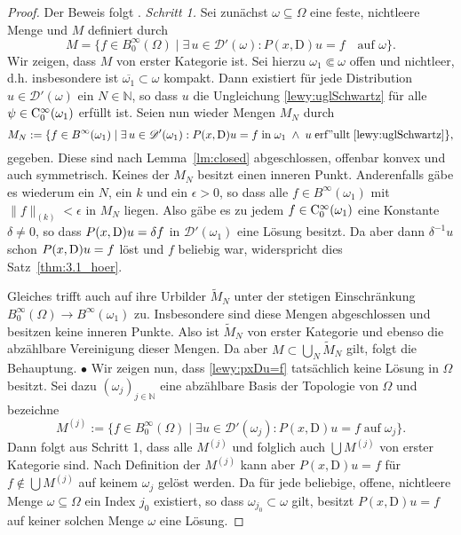 \begin{proof} Der Beweis folgt {\cite[Theorem 3.2]{Hormander:1960a}}.
{\sl Schritt 1.}
Sei zunächst $\omega\subseteq\Omega$ eine feste, nichtleere Menge und $M$ definiert durch
\begin{equation}
M=\{f\in B_0^\infty(\Omega)\mid \exists\,u\in\mathscr{D}'(\omega) : P(x,\mathrm{D})u=f\quad \text{auf $\omega$}\}.
\end{equation}
Wir zeigen, dass $M$ von erster Kategorie ist.  Sei hierzu $\omega_1\Subset\omega$ offen und nichtleer, d.h. insbesondere ist $\overline{\omega_1}\subset\omega$ kompakt. Dann existiert für jede Distribution $u\in\mathscr{D}'(\omega)$ ein $N\in\mathbb{N}$, so dass $u$ die Ungleichung \eqref{lewy:uglSchwartz}
für alle $\psi\in \mathrm C_0^\infty(\omega_1)$ erfüllt ist. Seien nun wieder Mengen $M_N$ durch
\begin{equation}
M_N:= \{f\in B^\infty(\omega_1)\mid \exists\,u\in\mathscr D'(\omega_1): P(x,\mathrm{D})u=f\;\mathrm{in}\;\omega_1\;\wedge\; u\mathrm{\;erf"ullt\;}\eqref{lewy:uglSchwartz}\},
\end{equation}
gegeben. Diese sind nach Lemma~\ref{lm:closed} abgeschlossen, offenbar konvex und auch symmetrisch. 
Keines der $M_N$ besitzt einen inneren Punkt. 
Anderenfalls gäbe es wiederum ein $N$, ein $k$ und ein $\epsilon>0$, so dass alle $f\in B^\infty(\omega_1)$ mit
$\|f\|_{(k)}<\epsilon$ in $M_N$ liegen. Also gäbe es zu jedem $f\in\mathrm C_0^\infty(\omega_1)$ eine Konstante $\delta\ne0$, so dass $P(x,\mathrm D)u=\delta f$ in $\mathscr D'(\omega_1)$ eine L\"osung besitzt. Da aber dann $\delta^{-1}u$ schon $P(x,\mathrm D)u=f$ löst und $f$ beliebig war, widerspricht dies Satz~\ref{thm:3.1_hoer}. 

Gleiches trifft auch auf ihre Urbilder $\widetilde M_N$ unter der stetigen Einschränkung $B^\infty_0(\Omega)\to B^\infty(\omega_1)$ zu. Insbesondere sind diese Mengen abgeschlossen und besitzen keine inneren Punkte. Also ist $\widetilde M_N$ von erster Kategorie und ebenso die abzählbare Vereinigung dieser Mengen. Da aber $M\subset \bigcup_N \widetilde M_N$ gilt, folgt die  Behauptung.
$\bullet$
Wir zeigen nun, dass \eqref{lewy:pxDu=f} tatsächlich keine Lösung in $\Omega$ besitzt. Sei dazu $(\omega_j)_{j\in\mathbb{N}}$ eine abzählbare Basis der Topologie von $\Omega$ und bezeichne
\begin{equation}
M^{(j)}:=\{f\in B_0^\infty(\Omega)\mid \exists u\in\mathscr{D}'(\omega_j): P(x,\mathrm{D})u=f\;\mathrm{auf\;}\omega_j\}.
\end{equation}
Dann folgt aus Schritt 1, dass alle $M^{(j)}$ und folglich auch $\bigcup M^{(j)}$ von erster Kategorie sind. Nach Definition der $M^{(j)}$ kann aber $P(x,\mathrm{D})u=f$ für $f\not\in  \bigcup M^{(j)}$ auf keinem $\omega_j$ gelöst werden. Da für jede beliebige, offene, nichtleere Menge $\omega\subseteq\Omega$ ein Index $j_0$ existiert, so dass $\omega_{j_0}\subset\omega$ gilt, besitzt $P(x,\mathrm{D})u=f$ auf keiner solchen Menge $\omega$ eine Lösung. 
\end{proof}



